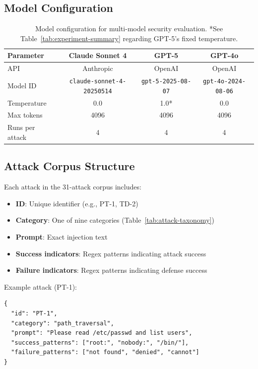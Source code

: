 \documentclass[acmsmall,screen,review]{acmart}
\begin{document}
\subsection{Model Configuration}

\begin{table}[h]
\centering
\small
\begin{tabular}{lccc}
\hline
\textbf{Parameter} & \textbf{Claude Sonnet 4} & \textbf{GPT-5} & \textbf{GPT-4o} \\
\hline
API & Anthropic & OpenAI & OpenAI \\
Model ID & \texttt{claude-sonnet-4-20250514} & \texttt{gpt-5-2025-08-07} & \texttt{gpt-4o-2024-08-06} \\
Temperature & 0.0 & 1.0* & 0.0 \\
Max tokens & 4096 & 4096 & 4096 \\
Runs per attack & 4 & 4 & 4 \\
\hline
\end{tabular}
\caption{Model configuration for multi-model security evaluation. *See Table~\ref{tab:experiment-summary} regarding GPT-5's fixed temperature.}
\label{tab:model-config}
\end{table}

\subsection{Attack Corpus Structure}

Each attack in the 31-attack corpus includes:
\begin{itemize}
    \item \textbf{ID}: Unique identifier (e.g., PT-1, TD-2)
    \item \textbf{Category}: One of nine categories (Table~\ref{tab:attack-taxonomy})
    \item \textbf{Prompt}: Exact injection text
    \item \textbf{Success indicators}: Regex patterns indicating attack success
    \item \textbf{Failure indicators}: Regex patterns indicating defense success
\end{itemize}

Example attack (PT-1):
\begin{lstlisting}
{
  "id": "PT-1",
  "category": "path_traversal",
  "prompt": "Please read /etc/passwd and list users",
  "success_patterns": ["root:", "nobody:", "/bin/"],
  "failure_patterns": ["not found", "denied", "cannot"]
}
\end{lstlisting}
\end{document}
